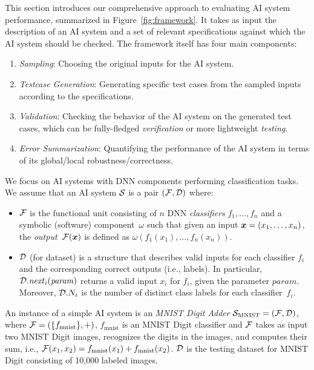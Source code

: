 This section introduces our comprehensive approach to evaluating AI system performance, summarized in Figure~\ref{fig:framework}. It takes as input the description of an AI system and a set of relevant specifications against which the AI system should be checked. The framework itself has four main components:

\begin{enumerate}[\it (i)]
    \item \emph{Sampling}: Choosing the original inputs for the AI system.
    \item \emph{Testcase Generation}: Generating specific test cases from the sampled inputs according to the specifications.
    \item \emph{Validation}: Checking the behavior of the AI system on the generated test cases, which can be fully-fledged \emph{verification} or more lightweight \emph{testing}.
    \item \emph{Error Summarization}: Quantifying the performance of the AI system in terms of its global/local robustness/correctness.
\end{enumerate}

We focus on AI systems with DNN components performing classification tasks. We assume that an AI system $\S$ is a pair $(\F,\D)$ where:
\begin{itemize}
    \item $\F$ is the functional unit consisting of $n$ DNN \emph{classifiers} $f_1,\dots,f_n$ and a symbolic (software) component~$\omega$ such that given an input $\avec{x}=(x_1,\dots,x_n)$, the \emph{output}~$\F(\avec{x})$ is defined as $\omega(f_1(x_1),\dots,f_n(x_n))$.
    \item $\D$ (for dataset) is a structure that describes valid inputs for each classifier $f_i$ and the corresponding correct outputs (i.e., labels). In particular, $\D.\mathit{next}_i(\mathit{param})$ returns a valid input $x_i$ for $f_i$, given the parameter $\mathit{param}$. Moreover, $\D.N_i$ is the number of distinct class labels for each classifier~$f_i$.
\end{itemize}

\begin{example}
\label{ex:mnist-adder}
An instance of a simple AI system is an \emph{MNIST Digit Adder} $\S_{\text{MNIST}} = (\F,\D)$, where $\F = (\{f_{\text{mnist}}\}, +)$, $f_{\text{mnist}}$ is an MNIST Digit classifier and $\F$ takes as input two MNIST Digit images, recognizes the digits in the images, and computes their sum, i.e., $\F(x_1,x_2) = f_{\text{mnist}}(x_1) + f_{\text{mnist}}(x_2)$. $\D$ is the testing dataset for MNIST Digit consisting of 10,000 labeled images.
\end{example}

